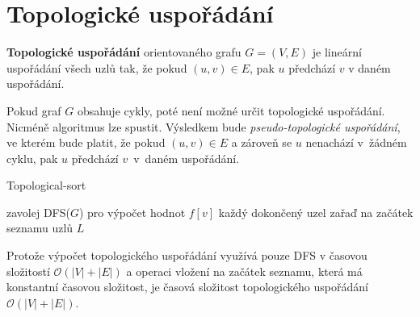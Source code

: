     \section{Topologické uspořádání}
        \begin{definition}
            \textbf{Topologické uspořádání} orientovaného grafu $G = (V, E)$ je lineární uspořádání všech uzlů tak, že pokud $(u, v) \in E$, pak $u$ předchází $v$ v daném uspořádání.\\
        \end{definition}

        Pokud graf $G$ obsahuje cykly, poté není možné určit topologické uspořádání. Nicméně algoritmus lze spustit. Výsledkem bude \textit{pseudo-topologické uspořádání}, ve kterém bude platit, že pokud $(u, v) \in E$ a zároveň se $u$ nenachází v~žádném cyklu, pak $u$ předchází $v$~v~daném uspořádání.

        \begin{algorithm}
            \DontPrintSemicolon
            \caption{Topological-sort}
            \vspace*{0.5em}

            zavolej DFS($G$) pro výpočet hodnot $f[v]$\;
            každý dokončený uzel zařaď na začátek seznamu uzlů $L$\;
            \vspace*{0.5em}

        \end{algorithm}

        \begin{theorem}
            Protože výpočet topologického uspořádání využívá pouze DFS v časovou složitostí $\mathcal{O}(|V| + |E|)$ a operaci vložení na začátek seznamu, která má konstantní časovou složitost, je časová složitost topologického uspořádání $\mathcal{O}(|V| + |E|)$.
        \end{theorem}

